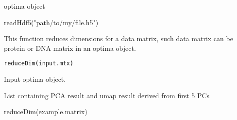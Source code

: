 \documentclass[a4paper]{book}
\begin{document}
%
\begin{Value}
optima object
\end{Value}
%
\begin{Examples}
\begin{ExampleCode}
readHdf5("path/to/my/file.h5")
\end{ExampleCode}
\end{Examples}
%
\begin{Description}\relax
This function reduces dimensions for a data matrix, such data matrix
can be protein or DNA matrix in an optima object.
\end{Description}
%
\begin{Usage}
\begin{verbatim}
reduceDim(input.mtx)
\end{verbatim}
\end{Usage}
%
\begin{Arguments}
\begin{ldescription}
\item[\code{input.mtx}] Input optima object.
\end{ldescription}
\end{Arguments}
%
\begin{Value}
List containing PCA result and umap result derived from first 5 PCs
\end{Value}
%
\begin{Examples}
\begin{ExampleCode}
reduceDim(example.matrix)
\end{ExampleCode}
\end{Examples}
\printindex{}
\end{document}

